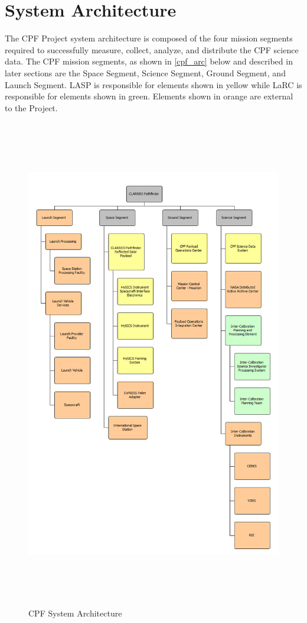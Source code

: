 \documentclass[12pt,oneside,oldfontcommands]{memoir}
\begin{document}
\section{System Architecture }
\label{systemarchitecture}

The \gls{CPF} Project system architecture is composed of the four mission segments required to successfully \gls{measure}, \gls{collect}, analyze, and distribute the \gls{CPF} science data. The \gls{CPF} mission segments, as shown in \autoref{cpf_arc} below and described in later sections are the Space Segment, Science Segment, Ground Segment, and Launch Segment. \gls{LASP} is responsible for elements shown in yellow while \gls{LaRC} is responsible for elements shown in green. Elements shown in orange are external to the Project.

\begin{figure}[htbp]
\centering
\includegraphics[keepaspectratio,width=\textwidth,height=8.5in]{20171214_cpf_architecture_l1-4.png}
\caption{\gls{CPF} System Architecture}
\label{cpf_arc}
\end{figure}
\end{document}
